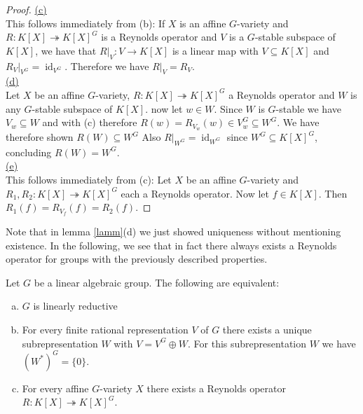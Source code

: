 \begin{proof}
  \underline{(c)}\\
  This follows immediately from (b):
  If $X$ is an affine $G$-variety and $R \colon K[X] \twoheadrightarrow K[X]^G$ is a Reynolds operator and $V$ is a $G$-stable subspace of $K[X]$, we have that $\left. R \right|_V \colon V \longrightarrow K[X]$ is a linear map with $V \subseteq K[X]$ and $\left. R_V \right|_{V^G} = \operatorname{id}_{V^G}$.
  Therefore we have $\left. R \right|_V = R_V$.  \\
  \underline{(d)}\\
  Let $X$ be an affine $G$-variety, $R \colon K[X] \twoheadrightarrow K[X]^G$ a Reynolds operator and $W$ is any $G$-stable subspace of $K[X]$.
  now let $w \in W$.
  Since $W$ is $G$-stable we have $V_w \subseteq W$ and with (c) therefore $R(w) = R_{V_w} (w) \in V_w^G \subseteq W^G$.
  We have therefore shown $R(W) \subseteq W^G$
  Also $\left. R \right|_{W^G} = \operatorname{id}_{W^G}$ since $W^G \subseteq K[X]^G$, concluding $R(W) = W^G$.  \\
  \underline{(e)}\\
  This follows immediately from (c):
  Let $X$ be an affine $G$-variety and $R_1,R_2 \colon K[X] \twoheadrightarrow K[X]^G$ each a Reynolds operator.
  Now let $f \in K[X]$.
  Then $R_1(f) = R_{V_f} (f) = R_2 (f)$.
\end{proof}

\begin{remark}
  Note that in lemma \ref{lamm}(d) we just showed uniqueness without mentioning existence.
  In the following, we see that in fact there always exists a Reynolds operator for groups with the previously described properties.
\end{remark}


\begin{theorem}\label{equiv}
  Let $G$ be a linear algebraic group.
  The following are equivalent:
  \begin{enumerate}[(a)]
  \item $G$ is linearly reductive
  \item For every finite rational representation $V$ of $G$ there exists a unique subrepresentation $W$ with $V = V^G \oplus W$.
    For this subrepresentation $W$ we have $(W^\ast)^G = \{0\}$.
  \item For every affine $G$-variety $X$ there exists a Reynolds operator $R \colon K[X] \twoheadrightarrow K[X]^G $.
  \end{enumerate}
\end{theorem}

